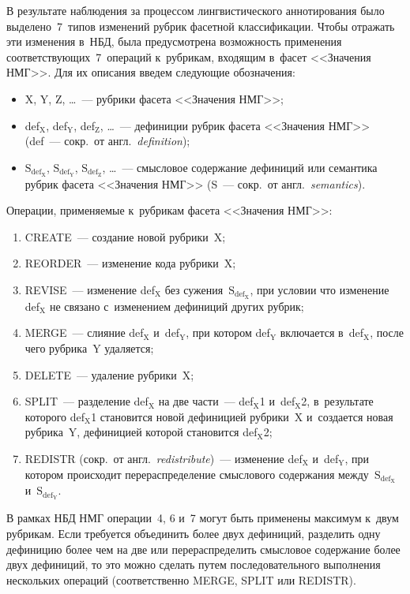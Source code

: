 \begin{multicols}{2}
     В результате наблюдения за процессом лингвистического аннотирования 
было выделено~7~типов изменений рубрик фасетной классификации. Чтобы 
отражать эти изменения в~НБД, была преду\-смотрена возможность применения 
со\-от\-вет\-ст\-ву\-ющих~7~операций к~рубрикам, входящим в~фасет <<Значения 
НМГ>>. Для их описания введем сле\-ду\-ющие обозначения:
\begin{itemize}
\item X, Y, Z, \ldots~--- рубрики фасета <<Значения НМГ>>;
\item def$_{\mathrm{X}}$, def$_{\mathrm{Y}}$, def$_{\mathrm{Z}}$, 
\ldots~--- дефиниции рубрик фасета <<Значения НМГ>> (def~--- сокр.\ от 
англ.\ \textit{definition});
\item $\mathrm{S_{def_X}}$, $\mathrm{S_{def_Y}}$, 
$\mathrm{S_{def_Z}}$, \ldots~--- смысловое содержание дефиниций или 
семантика рубрик фасета <<Значения НМГ>> (S~---  сокр.\ от англ.\ 
\textit{semantics}).
\end{itemize}

Операции, применяемые к~рубрикам фасета <<Значения НМГ>>:
\begin{enumerate}[(1)]
\item CREATE~--- создание новой рубрики~X;
\item REORDER~--- изменение кода рубрики~X;
\item REVISE~--- изменение def$_{\mathrm{X}}$ без 
сужения~$\mathrm{S_{def_X}}$, при условии что изменение 
def$_{\mathrm{X}}$ не связано с~изменением дефиниций других рубрик;
\item MERGE~--- слияние def$_{\mathrm{X}}$ и~def$_{\mathrm{Y}}$, 
при котором def$_{\mathrm{Y}}$ включается в~def$_{\mathrm{X}}$, 
после чего рубрика~${\mathrm{Y}}$ удаляется;
\item DELETE~--- удаление рубрики~X;
\item SPLIT~--- разделение def$_{\mathrm{X}}$ на две части~--- 
def$_{\mathrm{X}}$1 и~def$_{\mathrm{X}}$2, в~результате которого 
def$_{\mathrm{X}}$1 становится новой дефиницией рубрики~X 
и~создается новая рубрика~Y, дефиницией которой становится 
def$_{\mathrm{X}}$2;
\item REDISTR (сокр.\ от англ.\ \textit{redistribute})~--- изменение 
def$_{\mathrm{X}}$ и~def$_{\mathrm{Y}}$, при котором происходит 
перераспределение смыслового содержания 
между~$\mathrm{S_{def_X}}$ и~$\mathrm{S_{def_Y}}$.
     \end{enumerate}
     
     В рамках НБД НМГ операции~4, 6 и~7 могут быть применены максимум 
к~двум рубрикам. Если требуется объединить более двух дефиниций, разделить 
одну дефиницию более чем на две или перераспределить смысловое 
содержание более двух дефиниций, то это можно сделать путем 
последовательного выполнения нескольких операций (соответственно MERGE, 
SPLIT или REDISTR).
     

\end{multicols}
